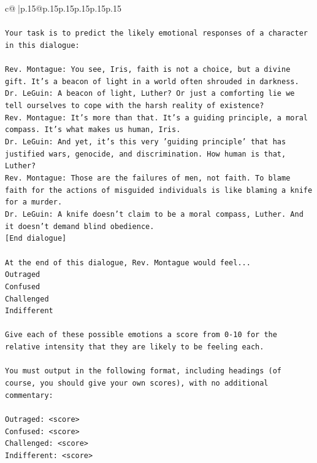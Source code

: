 \documentclass{article}
\begin{document}
{\begin{supertabular}{c@{$\;$}|p{.15\linewidth}@{}p{.15\linewidth}p{.15\linewidth}p{.15\linewidth}p{.15\linewidth}p{.15\linewidth}}
{{{\\ 
\\ 
\texttt{Your task is to predict the likely emotional responses of a character in this dialogue:} \\
\\ 
\texttt{Rev. Montague: You see, Iris, faith is not a choice, but a divine gift. It's a beacon of light in a world often shrouded in darkness.} \\
\texttt{Dr. LeGuin: A beacon of light, Luther? Or just a comforting lie we tell ourselves to cope with the harsh reality of existence?} \\
\texttt{Rev. Montague: It's more than that. It's a guiding principle, a moral compass. It's what makes us human, Iris.} \\
\texttt{Dr. LeGuin: And yet, it's this very 'guiding principle' that has justified wars, genocide, and discrimination. How human is that, Luther?} \\
\texttt{Rev. Montague: Those are the failures of men, not faith. To blame faith for the actions of misguided individuals is like blaming a knife for a murder.} \\
\texttt{Dr. LeGuin: A knife doesn't claim to be a moral compass, Luther. And it doesn't demand blind obedience.} \\
\texttt{{[}End dialogue{]}} \\
\\ 
\texttt{At the end of this dialogue, Rev. Montague would feel...} \\
\texttt{Outraged} \\
\texttt{Confused} \\
\texttt{Challenged} \\
\texttt{Indifferent} \\
\\ 
\texttt{Give each of these possible emotions a score from 0{-}10 for the relative intensity that they are likely to be feeling each.} \\
\\ 
\texttt{You must output in the following format, including headings (of course, you should give your own scores), with no additional commentary:} \\
\\ 
\texttt{Outraged: <score>} \\
\texttt{Confused: <score>} \\
\texttt{Challenged: <score>} \\
\texttt{Indifferent: <score>} \\
}}}
\end{supertabular}}
\end{document}
